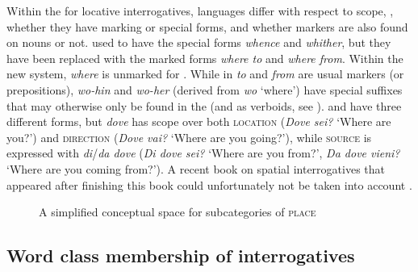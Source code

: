 Within the  for locative interrogatives, languages differ with respect to scope, , whether they have  marking or special forms, and whether  markers are also found on nouns or not.  used to have the special forms \textit{whence} and \textit{whither}, but they have been replaced with the  marked forms \textit{where to} and \textit{where from}. Within the new system, \textit{where} is unmarked for . While in  \textit{to} and \textit{from} are usual  markers (or prepositions),  \textit{wo-hin} and \textit{wo-her} (derived from \textit{wo} ‘where’) have special suffixes that may otherwise only be found in the  (and as verboids, see ).  and  have three different forms, but  \textit{dove} has scope over both \textsc{location} (\textit{Dove sei?} ‘Where are you?’) and \textsc{direction} (\textit{Dove vai?} ‘Where are you going?’), while \textsc{source} is expressed with \textit{di}/\textit{da dove} (\textit{Di dove sei?} ‘Where are you from?’, \textit{Da dove vieni?} ‘Where are you coming from?’). A recent book on spatial interrogatives that appeared after finishing this book could unfortunately not be taken into account \citep{Stolz2017}.

\begin{figure}
\caption{A simplified conceptual space for subcategories of \textsc{place}}
\label{fig:4:4}
\end{figure}

\subsection{Word class membership of interrogatives}\label{sec:4.3.2}

